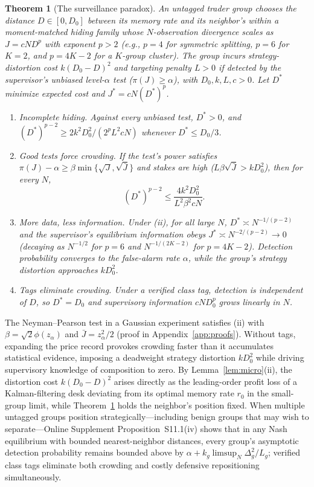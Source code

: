 \documentclass[11pt,letterpaper]{article}
\newtheorem{theorem}{Theorem}[section]
\theoremstyle{definition}
\begin{document}
\begin{theorem}[The surveillance paradox]\label{thm:paradox}
An untagged trader group chooses the distance $D \in [0, D_0]$ between its memory rate and its neighbor's within a moment-matched hiding family whose $N$-observation divergence scales as $J = c N D^p$ with exponent $p > 2$ (e.g., $p = 4$ for symmetric splitting, $p = 6$ for $K = 2$, and $p = 4K - 2$ for a $K$-group cluster). The group incurs strategy-distortion cost $k(D_0 - D)^2$ and targeting penalty $L > 0$ if detected by the supervisor's unbiased level-$\alpha$ test ($\pi(J) \ge \alpha$), with $D_0, k, L, c > 0$. Let $D^*$ minimize expected cost and $J^* = c N (D^*)^p$.
\begin{enumerate}
  \item[(i)] \emph{Incomplete hiding.} Against every unbiased test, $D^* > 0$, and $(D^*)^{p-2} \ge 2 k^2 D_0^2 / (2^p L^2 c N)$ whenever $D^* \le D_0 / 3$.
  \item[(ii)] \emph{Good tests force crowding.} If the test's power satisfies $\pi(J) - \alpha \ge \beta \min\{\sqrt{J}, \sqrt{\bar{J}}\}$ and stakes are high ($L \beta \sqrt{\bar{J}} > k D_0^2$), then for every $N$,
  \[
    (D^*)^{p-2} \le \frac{4 k^2 D_0^2}{L^2 \beta^2 c N}.
  \]
  \item[(iii)] \emph{More data, less information.} Under (ii), for all large $N$, $D^* \asymp N^{-1/(p-2)}$ and the supervisor's equilibrium information obeys $J^* \asymp N^{-2/(p-2)} \to 0$ (decaying as $N^{-1/2}$ for $p = 6$ and $N^{-1/(2K-2)}$ for $p = 4K - 2$). Detection probability converges to the false-alarm rate $\alpha$, while the group's strategy distortion approaches $k D_0^2$.
  \item[(iv)] \emph{Tags eliminate crowding.} Under a verified class tag, detection is independent of $D$, so $D^* = D_0$ and supervisory information $c N D_0^p$ grows linearly in $N$.
\end{enumerate}
\end{theorem}

The Neyman--Pearson test in a Gaussian experiment satisfies (ii) with $\beta = \sqrt{2}\phi(z_\alpha)$ and $\bar{J} = z_\alpha^2 / 2$ (proof in Appendix~\ref{app:proofs}). Without tags, expanding the price record provokes crowding faster than it accumulates statistical evidence, imposing a deadweight strategy distortion $k D_0^2$ while driving supervisory knowledge of composition to zero. By Lemma~\ref{lem:micro}(ii), the distortion cost $k(D_0 - D)^2$ arises directly as the leading-order profit loss of a Kalman-filtering desk deviating from its optimal memory rate $r_0$ in the small-group limit, while Theorem~\ref{thm:paradox} holds the neighbor's position fixed. When multiple untagged groups position strategically—including benign groups that may wish to separate—Online Supplement Proposition~S11.1(iv) shows that in any Nash equilibrium with bounded nearest-neighbor distances, every group's asymptotic detection probability remains bounded above by $\alpha + k_g \limsup_N \Delta_g^2 / L_g$; verified class tags eliminate both crowding and costly defensive repositioning simultaneously.
\end{document}
